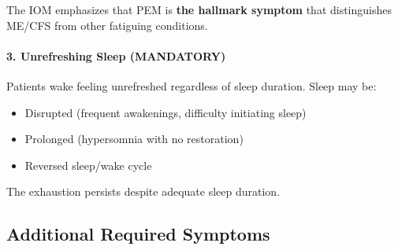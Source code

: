 \begin{requirement}
The IOM emphasizes that PEM is \textbf{the hallmark symptom} that distinguishes ME/CFS from other fatiguing conditions.

\paragraph{3. Unrefreshing Sleep (MANDATORY)}

Patients wake feeling unrefreshed regardless of sleep duration. Sleep may be:
\begin{itemize}
    \item Disrupted (frequent awakenings, difficulty initiating sleep)
    \item Prolonged (hypersomnia with no restoration)
    \item Reversed sleep/wake cycle
\end{itemize}

The exhaustion persists despite adequate sleep duration.
\end{requirement}

\subsection{Additional Required Symptoms}

